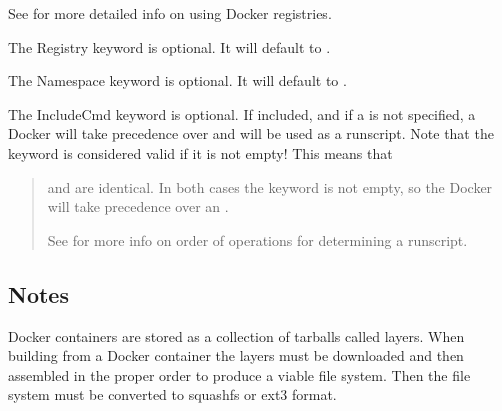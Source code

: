 \documentclass[letterpaper,10pt,english]{sphinxmanual}
\begin{document}
See  for more detailed info on using Docker registries.

%
\begin{sphinxVerbatim}[commandchars=\\\{\}]
 
\end{sphinxVerbatim}

The Registry keyword is optional. It will default to .

%
\begin{sphinxVerbatim}[commandchars=\\\{\}]
 
\end{sphinxVerbatim}

The Namespace keyword is optional. It will default to .

%
\begin{sphinxVerbatim}[commandchars=\\\{\}]
 
\end{sphinxVerbatim}

The IncludeCmd keyword is optional. If included, and if a  is not specified, a Docker  will take precedence over 
and will be used as a runscript. Note that the  keyword is considered valid if it is not empty! This means that
\begin{quote}

 and  are identical. In both cases the  keyword is not empty, so the Docker  will take precedence
over an .

See  for more info on order of operations for determining a runscript.
\end{quote}


\subsection{Notes}
\label{\detokenize{appendix:notes}}
Docker containers are stored as a collection of tarballs called layers. When building from a Docker container the layers must be downloaded and then
assembled in the proper order to produce a viable file system. Then the file system must be converted to squashfs or ext3 format.
\end{document}
